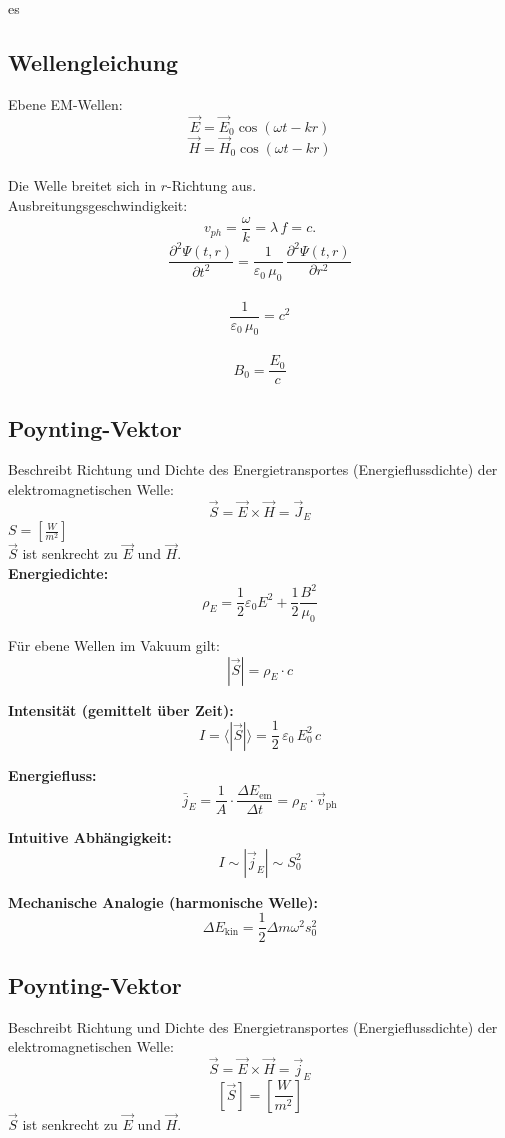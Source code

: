 es\documentclass[a4paper, fontsize=8pt, landscape]{scrartcl}
\begin{document}
\begin{multicols*}{4}
\subsection{Wellengleichung}
    Ebene EM-Wellen:
    \[\vec E = \vec E_0 \cos(\omega t - k r)\]
    \[\vec H = \vec H_0 \cos(\omega t - k r)\]\\

    Die Welle breitet sich in $r$-Richtung aus.\\
    Ausbreitungsgeschwindigkeit:
    \[v_{ph} = \frac{\omega}{k} = \lambda\,f = c.\]
    \[\frac{\partial^2 \Psi(t,r)}{\partial t^2} = \frac{1}{\varepsilon_0 \,\mu_0} \,\frac{\partial^2 \Psi(t,r)}{\partial r^2}\]\\
    \[\frac{1}{\varepsilon_0 \,\mu_0} = c^2\]\\
    \[B_0 = \frac{E_0}{c}\]

\subsection{Poynting-Vektor}
Beschreibt Richtung und Dichte des Energietransportes (Energieflussdichte) der elektromagnetischen Welle:
\[
\vec{S} = \vec{E} \times \vec{H} = \vec{J}_E
\]
$S = [\frac{W}{m^2}]$\\
\(\vec{S}\) ist senkrecht zu \(\vec{E}\) und \(\vec{H}\).\\

\textbf{Energiedichte:}
\[
\rho_E = \frac{1}{2} \varepsilon_0 E^2 + \frac{1}{2} \frac{B^2}{\mu_0}
\]

Für ebene Wellen im Vakuum gilt:
\[
|\vec{S}| = \rho_E \cdot c
\]

\textbf{Intensität (gemittelt über Zeit):}
\[
I = \langle |\vec{S}| \rangle = \frac{1}{2}\,\varepsilon_0\,E_0^2\,c
\]

\textbf{Energiefluss:}
\[
\bar{j}_E = \frac{1}{A} \cdot \frac{\Delta E_{\text{em}}}{\Delta t} = \rho_E \cdot \vec{v}_{\text{ph}}
\]

\textbf{Intuitive Abhängigkeit:}
\[
I \sim |\vec{j}_E| \sim S_0^2
\]

\textbf{Mechanische Analogie (harmonische Welle):}
\[
\Delta E_{\text{kin}} = \frac{1}{2} \Delta m \omega^2 s_0^2
\]

\subsection{Poynting-Vektor}
Beschreibt Richtung und Dichte des Energietransportes (Energieflussdichte) der elektromagnetischen Welle:
\[
\vec{S} = \vec{E} \times \vec{H} = \vec{j}_E
\]
\[
[\vec{S}] = \left[\frac{W}{m^2}\right]
\]
\(\vec{S}\) ist senkrecht zu \(\vec{E}\) und \(\vec{H}\).\\


\end{multicols*}
\end{document}
